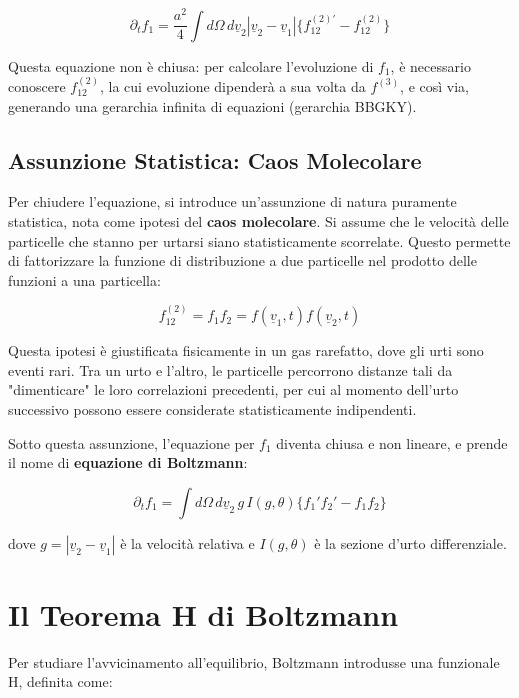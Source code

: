 \begin{equation}
\partial_t f_1 = \frac{a^2}{4} \int d\Omega \, d\underline{v}_2 |\underline{v}_2 - \underline{v}_1| \{ f_{12}^{(2)'} - f_{12}^{(2)} \}
\end{equation}

Questa equazione non è chiusa: per calcolare l'evoluzione di $f_1$, è necessario conoscere $f_{12}^{(2)}$, la cui evoluzione dipenderà a sua volta da $f^{(3)}$, e così via, generando una gerarchia infinita di equazioni (gerarchia BBGKY).

\subsection{Assunzione Statistica: Caos Molecolare}
Per chiudere l'equazione, si introduce un'assunzione di natura puramente statistica, nota come ipotesi del \textbf{caos molecolare}. Si assume che le velocità delle particelle che stanno per urtarsi siano statisticamente scorrelate. Questo permette di fattorizzare la funzione di distribuzione a due particelle nel prodotto delle funzioni a una particella:

\begin{equation}
f_{12}^{(2)} = f_1 f_2 = f(\underline{v}_1, t) f(\underline{v}_2, t)
\end{equation}

Questa ipotesi è giustificata fisicamente in un gas rarefatto, dove gli urti sono eventi rari. Tra un urto e l'altro, le particelle percorrono distanze tali da "dimenticare" le loro correlazioni precedenti, per cui al momento dell'urto successivo possono essere considerate statisticamente indipendenti.

Sotto questa assunzione, l'equazione per $f_1$ diventa chiusa e non lineare, e prende il nome di \textbf{equazione di Boltzmann}:

\begin{equation}
\partial_t f_1 = \int d\Omega \, d\underline{v}_2 \, g \, I(g, \theta) \{ f_1' f_2' - f_1 f_2 \}
\end{equation}

dove $g = |\underline{v}_2 - \underline{v}_1|$ è la velocità relativa e $I(g, \theta)$ è la sezione d'urto differenziale.

\section{Il Teorema H di Boltzmann}

Per studiare l'avvicinamento all'equilibrio, Boltzmann introdusse una funzionale H, definita come:

